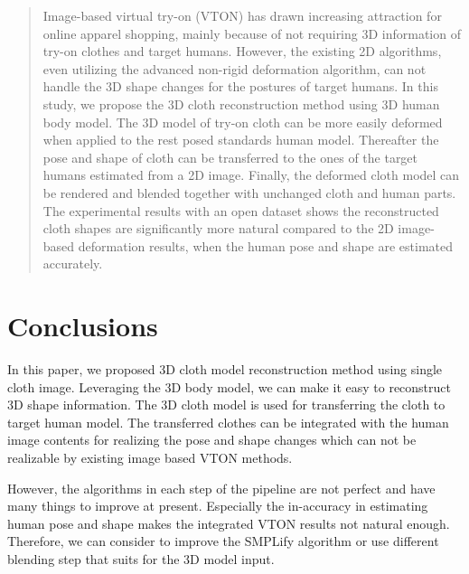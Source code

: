 \documentclass[runningheads]{llncs}
\begin{document}
\begin{abstract}

Image-based virtual try-on (VTON) has drawn increasing attraction for online apparel shopping, mainly because of not requiring 3D information of try-on clothes and target humans. However, the existing 2D algorithms, even utilizing the advanced non-rigid deformation algorithm, can not handle the 3D shape changes for the postures of target humans. In this study, we propose the 3D cloth reconstruction method using 3D human body model. The 3D model of try-on cloth can be more easily deformed when applied to the rest posed standards human model. Thereafter the pose and shape of cloth can be transferred to the ones of the target humans estimated from a 2D image. Finally, the deformed cloth model can be rendered and blended together with unchanged cloth and human parts. The experimental results with an open dataset shows the reconstructed cloth shapes are significantly more natural compared to the 2D image-based deformation results, when the human pose and shape are estimated accurately.         

\end{abstract}




\section{Conclusions}  \label{section:conclusion}

In this paper, we proposed 3D cloth model reconstruction method using single cloth image. Leveraging the 3D body model, we can make it easy to reconstruct 3D shape information. The 3D cloth model is used for transferring the cloth to target human model.  The transferred clothes can be integrated with the human image contents for realizing the pose and shape changes which can not be realizable by existing image based VTON methods.

However, the algorithms in each step of the pipeline are not perfect and have many things to improve at present. Especially the in-accuracy in estimating human pose and shape makes the integrated VTON results not natural enough. Therefore, we can consider to improve the SMPLify\cite{Bogo2016SMPLify} algorithm or use different blending step that suits for the 3D model input.
     

  
\clearpage
%
%


\end{document}
